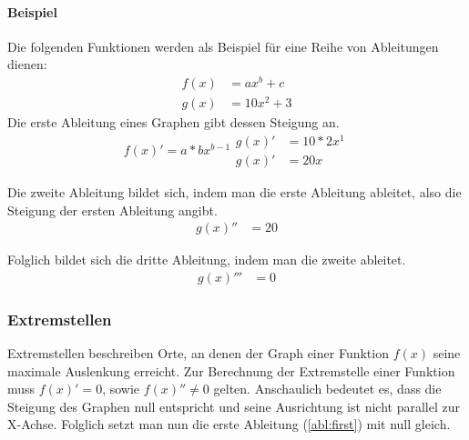 \documentclass[a4paper]{article}
\begin{document}
			\paragraph{Beispiel}
				Die folgenden Funktionen werden als Beispiel für eine Reihe von Ableitungen dienen:
				\begin{equation}
					\begin{split}
						f(x) &= ax^b + c\\
						g(x) &= 10x^2 + 3\label{abl:origin}
					\end{split}
				\end{equation}
				Die erste Ableitung eines Graphen gibt dessen Steigung an.
				\begin{subequations}
					\begin{equation}
						f(x)' = a * bx^{b-1}
					\end{equation}
					\begin{equation}
						\begin{split}
							g(x)' &= 10*2x^1\\
							g(x)' &= 20x\label{abl:first}
						\end{split}
					\end{equation}
				\end{subequations}
				
				Die zweite Ableitung bildet sich, indem man die erste Ableitung ableitet, also die Steigung der ersten Ableitung angibt.
				\begin{equation}
					\begin{split}
						g(x)'' &= 20\label{abl:second}
					\end{split}
				\end{equation}
				
				Folglich bildet sich die dritte Ableitung, indem man die zweite ableitet.
				\begin{equation}
					\begin{split}
						g(x)''' &= 0
					\end{split}
				\end{equation}
				
			\subsubsection{Extremstellen}
				Extremstellen beschreiben Orte, an denen der Graph einer Funktion $f(x)$ seine maximale Auslenkung erreicht. Zur Berechnung der Extremstelle einer Funktion muss $f(x)' = 0$, sowie $f(x)'' \neq 0$ gelten. Anschaulich bedeutet es, dass die Steigung des Graphen null entspricht und seine Ausrichtung ist nicht parallel zur X-Achse.
				Folglich setzt man nun die erste Ableitung (\ref{abl:first}) mit null gleich.
				
\end{document}
